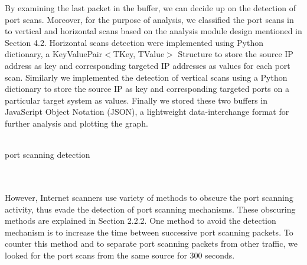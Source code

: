 By examining the last packet in the buffer, we can decide up on the detection of port scans.
Moreover, for the purpose of analysis, we classified the port scans in to vertical and horizontal scans based on the analysis module design mentioned in Section 4.2.
Horizontal scans detection were implemented using Python dictionary, a  KeyValuePair$<$TKey, TValue$>$ Structure to store the source IP address as key and corresponding targeted IP addresses as values for each port scan.
Similarly we implemented the detection of vertical scans using a Python dictionary to store the source IP as key and corresponding targeted ports on a particular target system as values. 
Finally we stored these two buffers in JavaScript Object Notation (JSON), a lightweight data-interchange format for further analysis and plotting the graph.\\\\
\begin{algorithm}[H]
\caption{port scanning detection}
\end{algorithm}
\noindent
\\\\
However, Internet scanners use variety of methods to obscure the port scanning activity, thus evade the detection of port scanning mechanisms.
These obscuring methods are explained in Section 2.2.2.
One method to avoid the detection mechanism is to increase the time between successive port scanning packets.
To counter this method and to separate port scanning packets from other traffic, we looked for the port scans from the same source for 300 seconds.
